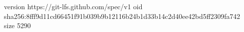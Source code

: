 version https://git-lfs.github.com/spec/v1
oid sha256:8fff9d11cd66451f91b039b9b12116b24b1d33b14c2d40ee42bd5ff2309fa742
size 5290
